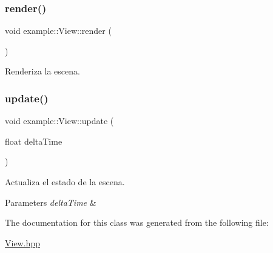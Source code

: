 \subsubsection{\texorpdfstring{render()}{render()}}
{\footnotesize\ttfamily void example\+::\+View\+::render (\begin{DoxyParamCaption}{ }\end{DoxyParamCaption})}



Renderiza la escena. 

\mbox{\label{classexample_1_1_view_ace94cb5c7410536cf87488bbb3be1ec6}} 
\subsubsection{\texorpdfstring{update()}{update()}}
{\footnotesize\ttfamily void example\+::\+View\+::update (\begin{DoxyParamCaption}\item[{float}]{delta\+Time }\end{DoxyParamCaption})}



Actualiza el estado de la escena. 


\begin{DoxyParams}{Parameters}
{\em delta\+Time} & \\
\hline
\end{DoxyParams}


The documentation for this class was generated from the following file\+:\begin{DoxyCompactItemize}
\item 
\mbox{\hyperlink{_view_8hpp}{View.\+hpp}}\end{DoxyCompactItemize}
